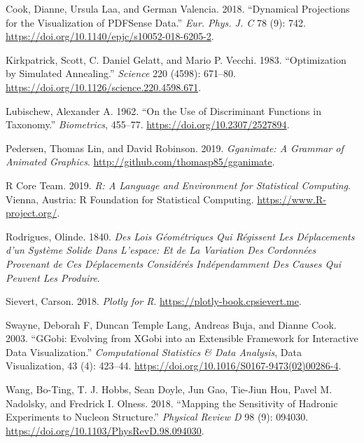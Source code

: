 \leavevmode\hypertarget{ref-cook_dynamical_2018}{}%
Cook, Dianne, Ursula Laa, and German Valencia. 2018. ``Dynamical
Projections for the Visualization of PDFSense Data.'' \emph{Eur. Phys.
J. C} 78 (9): 742. \url{https://doi.org/10.1140/epjc/s10052-018-6205-2}.

\leavevmode\hypertarget{ref-kirkpatrick_optimization_1983}{}%
Kirkpatrick, Scott, C. Daniel Gelatt, and Mario P. Vecchi. 1983.
``Optimization by Simulated Annealing.'' \emph{Science} 220 (4598):
671--80. \url{https://doi.org/10.1126/science.220.4598.671}.

\leavevmode\hypertarget{ref-lubischew_use_1962}{}%
Lubischew, Alexander A. 1962. ``On the Use of Discriminant Functions in
Taxonomy.'' \emph{Biometrics}, 455--77.
\url{https://doi.org/10.2307/2527894}.

\leavevmode\hypertarget{ref-pedersen_gganimate:_2019}{}%
Pedersen, Thomas Lin, and David Robinson. 2019. \emph{Gganimate: A
Grammar of Animated Graphics}.
\url{http://github.com/thomasp85/gganimate}.

\leavevmode\hypertarget{ref-r_core_team_r:_2019}{}%
R Core Team. 2019. \emph{R: A Language and Environment for Statistical
Computing}. Vienna, Austria: R Foundation for Statistical Computing.
\url{https://www.R-project.org/}.

\leavevmode\hypertarget{ref-rodrigues_lois_1840}{}%
Rodrigues, Olinde. 1840. \emph{Des Lois Géométriques Qui Régissent Les
Déplacements d'un Système Solide Dans L'espace: Et de La Variation Des
Cordonnées Provenant de Ces Déplacements Considérés Indépendamment Des
Causes Qui Peuvent Les Produire}.

\leavevmode\hypertarget{ref-sievert_plotly_2018}{}%
Sievert, Carson. 2018. \emph{Plotly for R}.
\url{https://plotly-book.cpsievert.me}.

\leavevmode\hypertarget{ref-swayne_ggobi:_2003}{}%
Swayne, Deborah F, Duncan Temple Lang, Andreas Buja, and Dianne Cook.
2003. ``GGobi: Evolving from XGobi into an Extensible Framework for
Interactive Data Visualization.'' \emph{Computational Statistics \& Data
Analysis}, Data Visualization, 43 (4): 423--44.
\url{https://doi.org/10.1016/S0167-9473(02)00286-4}.

\leavevmode\hypertarget{ref-wang_mapping_2018}{}%
Wang, Bo-Ting, T. J. Hobbs, Sean Doyle, Jun Gao, Tie-Jiun Hou, Pavel M.
Nadolsky, and Fredrick I. Olness. 2018. ``Mapping the Sensitivity of
Hadronic Experiments to Nucleon Structure.'' \emph{Physical Review D} 98
(9): 094030. \url{https://doi.org/10.1103/PhysRevD.98.094030}.

